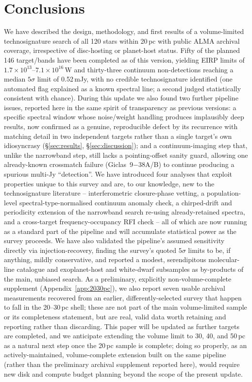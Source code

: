 \documentclass{openjournal}
\begin{document}
\section{Conclusions}
\label{sec:conclusions}

We have described the design, methodology, and first results of a
volume-limited technosignature search of all 120 stars within 20\,pc
with public ALMA archival coverage, irrespective of disc-hosting or
planet-host status. Fifty of the planned 146 target/bands have been
completed as of this version, yielding EIRP limits of
$1.7\times10^{13}$--$7.1\times10^{16}$\,W and thirty-three continuum
non-detections reaching a median $5\sigma$ limit of 0.52\,mJy, with no
credible technosignature identified (one automated flag explained as a
known spectral line; a second judged statistically consistent with
chance). During this update we also found two further
pipeline issues, reported here in the same spirit of transparency as
previous versions: a specific spectral window whose noise/weight
handling produces implausibly deep results, now confirmed as a genuine,
reproducible defect by its recurrence with matching detail in two
independent targets rather than a single target's own idiosyncrasy
(\S\ref{sec:results}, \S\ref{sec:discussion}); and a continuum-imaging
step that, unlike the narrowband step, still lacks a pointing-offset
sanity guard, allowing one already-known crossmatch failure
(Giclas~9$-$38A/B) to continue producing a spurious multi-Jy
``detection''. We have introduced four analyses
that exploit properties unique to this survey and are, to our knowledge,
new to the technosignature literature -- interferometric closure-phase
vetting, a population-level spectral-type-normalised continuum anomaly
check, a chirped-drift and periodicity extension of the narrowband
search re-using already-retained spectra, and a cross-target
frequency-occupancy RFI check -- all of which are now running as a
standard part of the pipeline and will accumulate statistical power as
the survey proceeds. We have also validated the pipeline's assumed
sensitivity directly via injection-recovery, finding the survey's
quoted $5\sigma$ limits to be, if anything, mildly conservative, and
reported a modest, serendipitous molecular-line catalogue and
exoplanet-host and white-dwarf subsamples as by-products of the main,
unbiased search. As a preliminary, explicitly non-volume-complete
supplement (Appendix~\ref{app:2030pc}), we also report seven usable
archival measurements recovered from an earlier, differently-selected
survey that happen to fall in the 20--30\,pc shell; these are not part of
the main volume-limited sample or its completeness statement, but are
real, valid data worth retaining and reporting rather than discarding.
This paper will be updated as further targets are
completed, and we anticipate extending the volume limit to 30, 40, and
50\,pc as a natural next step once the 20\,pc sample is complete; doing so
properly, as an actively-maintained, volume-complete extension built on
the same pipeline (rather than the preliminary archival supplement
reported here), would require new disk and compute budget planning
beyond the scope of the present update.
\end{document}
